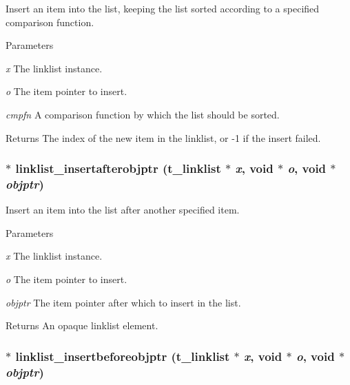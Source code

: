 Insert an item into the list, keeping the list sorted according to a specified comparison function. 
\begin{DoxyParams}{Parameters}
\item[{\em x}]The linklist instance. \item[{\em o}]The item pointer to insert. \item[{\em cmpfn}]A comparison function by which the list should be sorted. \end{DoxyParams}
\begin{DoxyReturn}{Returns}
The index of the new item in the linklist, or -\/1 if the insert failed. 
\end{DoxyReturn}
\hypertarget{group__linklist_gafd9471b4a798cd55d9d5bc79000b5a93}{
\subsubsection[{linklist\_\-insertafterobjptr}]{$\ast$ linklist\_\-insertafterobjptr ({\bf t\_\-linklist} $\ast$ {\em x}, \/  void $\ast$ {\em o}, \/  void $\ast$ {\em objptr})}}
\label{group__linklist_gafd9471b4a798cd55d9d5bc79000b5a93}


Insert an item into the list after another specified item. 
\begin{DoxyParams}{Parameters}
\item[{\em x}]The linklist instance. \item[{\em o}]The item pointer to insert. \item[{\em objptr}]The item pointer after which to insert in the list.\end{DoxyParams}
\begin{DoxyReturn}{Returns}
An opaque linklist element. 
\end{DoxyReturn}
\hypertarget{group__linklist_gaaa759a9962d69633c45efac04382fb61}{
\subsubsection[{linklist\_\-insertbeforeobjptr}]{$\ast$ linklist\_\-insertbeforeobjptr ({\bf t\_\-linklist} $\ast$ {\em x}, \/  void $\ast$ {\em o}, \/  void $\ast$ {\em objptr})}}
\label{group__linklist_gaaa759a9962d69633c45efac04382fb61}


